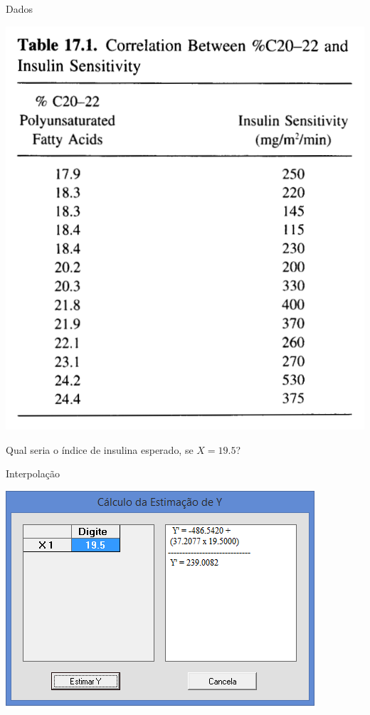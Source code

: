 \documentclass{beamer}
\begin{document}
\begin{frame}{Dados}
  \begin{center}
    \includegraphics[height=0.7\textheight]{table}

    Qual seria o índice de insulina esperado, se $X=19.5$?
  \end{center}
\end{frame}


\begin{frame}{Interpolação}
  \begin{center}
    \includegraphics[height=0.9\textheight]{interpolacao}
  \end{center}
\end{frame}
\end{document}
